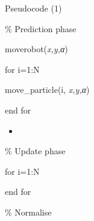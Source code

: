 \documentclass[compress]{beamer}
\begin{document}
\begin{frame}{Pseudocode (1)}
\begin{block}{\% Prediction phase}
\end{block}

\begin{block}{moverobot(\emph{x,y,α})}

\end{block}

\begin{block}{for i=1:N}

\end{block}

\begin{block}{move\_particle(i, \emph{x,y,α})}

\end{block}

\begin{block}{end for}

\end{block}

\begin{block}{}

\begin{itemize}
\item ~
\end{itemize}

\end{block}

\begin{block}{\% Update phase}

\end{block}

\begin{block}{}

\end{block}

\begin{block}{for i=1:N}

\end{block}

\begin{block}{}

\end{block}

\begin{block}{}

\end{block}

\begin{block}{end for}

\end{block}

\begin{block}{\% Normalise}

\end{block}


\end{frame}
\end{document}
